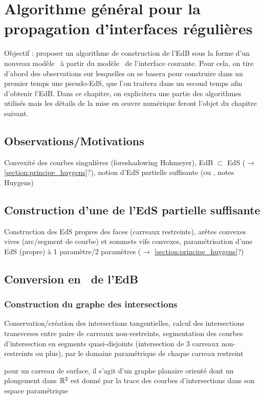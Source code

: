 \chapter[Algorithme de propagation d'interfaces régulières \piecewise]{Algorithme général pour la propagation d'interfaces régulières \piecewise}
\label{chap:algo_general}

Objectif : proposer un algorithme de construction de l'EdB sous la forme d'un nouveau modèle \brep\ à partir du modèle \brep\ de l'interface courante. 
Pour cela, on tire d'abord des observations sur lesquelles on se basera pour construire dans un premier temps une pseudo-EdS, que l'on traitera dans un second temps afin d'obtenir l'EdB. 
Dans ce chapitre, on explicitera une partie des algorithmes utilisés mais les détails de la mise en \oe uvre numérique feront l'objet du chapitre suivant.



\section{Observations/Motivations}
Convexité des courbes singulières (foreshadowing Hohmeyer), EdB $\subset$ EdS ($\to$ \autoref{section:principe_huygens}?), notion d'EdS partielle suffisante (ou , \cf notes Huygens)





\section{Construction d'une  de l'EdS partielle suffisante}
\label{section:def_canal_surface}
Construction des EdS propres des faces (carreaux restreints), arêtes convexes vives (arc/segment de courbe) et sommets vifs convexes, paramétrisation d'une EdS (propre) à 1 paramètre/2 paramètres ($\to$ \autoref{section:principe_huygens}?)




\section{Conversion en \brep\ de l'EdB}

\subsection{Construction du graphe des intersections}
Conservation/création des intersections tangentielles, calcul des intersections transverses entre paire de carreaux non-restreints, segmentation des courbes d'intersection en segments quasi-disjoints (intersection de 3 carreaux non-restreints ou plus),  par le domaine paramétrique de chaque carreau restreint
\par\bigskip
pour un carreau de surface, il s'agit d'un graphe planaire orienté dont un plongement dans $\mathbb{R}^2$ est donné par la trace des courbes d'intersections dans son espace paramétrique

